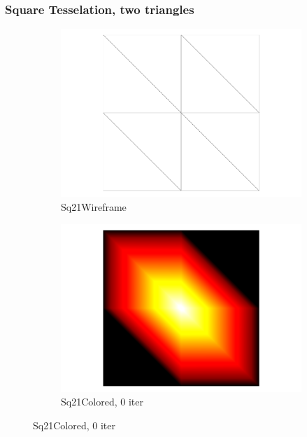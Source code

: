 \documentclass[openany]{book}
\begin{document}
\subsubsection{Square Tesselation, two triangles}
\begin{figure}
	\centering
	\begin{subfigure}{.48\linewidth}
		\centering
		\includegraphics[width=0.48\linewidth]{data/synthetic_meshes/square_tesselation_2tri_Dirac_delta_1_v9_f8_wireframe.png}
		\caption{Sq21Wireframe}\label{fig:sq2.a}
	\end{subfigure}
	\begin{subfigure}{.48\linewidth}
		\centering
		\includegraphics[width=0.48\linewidth]{data/synthetic_meshes/square_tesselation_2tri_Dirac_delta_1_v9_f8_funcvals.png}
		\caption{Sq21Colored, 0 iter}\label{fig:sq2.b}
	\end{subfigure}


\end{figure}
\end{document}
